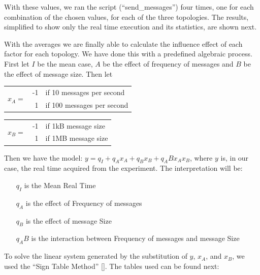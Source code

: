 With these values, we ran the script (``send_messages'') four times, one for each combination of the chosen values, for each of the three topologies. The results, simplified to show only the real time execution and its statistics, are shown next.
\newpage


	
With the averages we are finally able to calculate the influence effect of each factor for each topology. We have done this with a predefined algebraic process. First let $I$ be the mean case, $A$ be the effect of frequency of messages and $B$ be the effect of message size. Then let

\begin{center}
	\begin{tabular}{c | r l}
		\multirow{2}{*}{$x _A = $} & -1 & if 10  messages per second \\
		                           &  1 & if 100 messages per second \\
	\end{tabular}
\end{center}

\begin{center}
	\begin{tabular}{c | r l}
		\multirow{2}{*}{$x _B = $} & -1 & if 1kB message size \\
		                           &  1 & if 1MB message size \\
	\end{tabular}
\end{center}

Then we have the model: $y = q _I + q _A x _A + q _B x _B + q _AB x _A x _B $, where $y$ is, in our case, the real time acquired from the experiment. The interpretation will be:
\begin{itemize}
	\item[$q _I$] is the Mean Real Time
	\item[$q _A$] is the effect of Frequency of messages
	\item[$q _B$] is the effect of message Size
	\item[$q _AB$] is the interaction between Frequency of messages and message Size
\end{itemize}

To solve the linear system generated by the substitution of $y$, $x _A$, and $x _B$, we used the ``Sign Table Method'' [\citet{2KFACTORIAL}]. The tables used can be found next:





